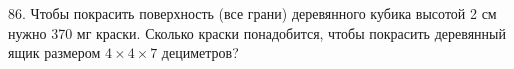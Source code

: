 86. Чтобы покрасить поверхность (все грани) деревянного кубика высотой 2 см нужно 370 мг краски. Сколько краски понадобится, чтобы покрасить деревянный ящик размером $4\times4\times7$ дециметров?\\
